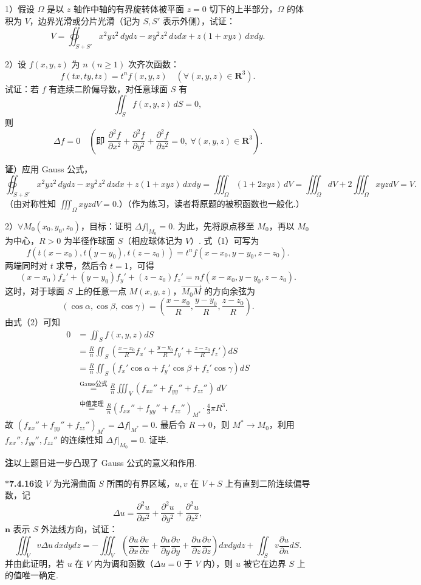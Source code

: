 \documentclass[UTF8, 12pt, fontset=fandol, oneside]{ctexart}
\providecommand{\xlongequal}[1]{\overset{#1}{=}}
\begin{document}
1）假设 $\Omega$ 是以 $z$ 轴作中轴的有界旋转体被平面 $z=0$ 切下的上半部分，$\Omega$ 的体积为 $V$，边界光滑或分片光滑（记为 $S,S'$ 表示外侧），试证：
\[
V=\oiint_{S+S'}x^2yz^2\,dydz-xy^2z^2\,dzdx+z(1+xyz)\,dxdy.
\]

2）设 $f(x,y,z)$ 为 $n\ (n\ge1)$ 次齐次函数：
\[
f(tx,ty,tz)=t^nf(x,y,z)\quad(\forall(x,y,z)\in\mathbf R^3). \tag{1}
\]
试证：若 $f$ 有连续二阶偏导数，对任意球面 $S$ 有
\[
\iint_Sf(x,y,z)\,dS=0, \tag{2}
\]
则
\[
\Delta f=0\quad\left(\text{即 }\frac{\partial^2f}{\partial x^2}+\frac{\partial^2f}{\partial y^2}+\frac{\partial^2f}{\partial z^2}=0,\ \forall(x,y,z)\in\mathbf R^3\right). \tag{3}
\]

\noindent\textbf{证}）应用 Gauss 公式，
\[
\oiint_{S+S'}x^2yz^2\,dydz-xy^2z^2\,dzdx+z(1+xyz)\,dxdy
=\iiint_\Omega(1+2xyz)\,dV=\iiint_\Omega dV+2\iiint_\Omega xyzdV=V.
\]
（由对称性知 $\iiint_\Omega xyzdV=0$.）（作为练习，读者将原题的被积函数也一般化.）

2）$\forall M_0(x_0,y_0,z_0)$，目标：证明 $\Delta f|_{M_0}=0$. 为此，先将原点移至 $M_0$，再以 $M_0$ 为中心，$R>0$ 为半径作球面 $S$（相应球体记为 $V$）. 式（1）可写为
\[
f(t(x-x_0),t(y-y_0),t(z-z_0))=t^nf(x-x_0,y-y_0,z-z_0).
\]
两端同时对 $t$ 求导，然后令 $t=1$，可得
\[
(x-x_0)f_x'+(y-y_0)f_y'+(z-z_0)f_z'=nf(x-x_0,y-y_0,z-z_0).
\]
这时，对于球面 $S$ 上的任意一点 $M(x,y,z)$，$\overrightarrow{M_0M}$ 的方向余弦为
\[
(\cos\alpha,\cos\beta,\cos\gamma)=\left(\frac{x-x_0}{R},\frac{y-y_0}{R},\frac{z-z_0}{R}\right).
\]
由式（2）可知
\[
\begin{aligned}
0&=\iint_Sf(x,y,z)dS\\
&=\frac Rn\iint_S\left(\frac{x-x_0}{R}f_x'+\frac{y-y_0}{R}f_y'+\frac{z-z_0}{R}f_z'\right)dS\\
&=\frac Rn\iint_S(f_x'\cos\alpha+f_y'\cos\beta+f_z'\cos\gamma)dS\\
&\xlongequal{\text{Gauss公式}}\frac Rn\iiint_V(f_{xx}''+f_{yy}''+f_{zz}'')\,dV\\
&\xlongequal{\text{中值定理}}\frac Rn(f_{xx}''+f_{yy}''+f_{zz}'')_{M^*}\cdot\frac43\pi R^3.
\end{aligned}
\]
故 $(f_{xx}''+f_{yy}''+f_{zz}'')_{M^*}=\Delta f|_{M^*}=0$. 最后令 $R\to0$，则 $M^*\to M_0$，利用 $f_{xx}'',f_{yy}'',f_{zz}''$ 的连续性知 $\Delta f|_{M_0}=0$. 证毕.

\noindent\textbf{注}\quad 以上题目进一步凸现了 Gauss 公式的意义和作用.

\noindent\textbf{$*$7.4.16}\quad 设 $V$ 为光滑曲面 $S$ 所围的有界区域，$u,v$ 在 $V+S$ 上有直到二阶连续偏导数，记
\[
\Delta u=\frac{\partial^2u}{\partial x^2}+\frac{\partial^2u}{\partial y^2}+\frac{\partial^2u}{\partial z^2},
\]
$\mathbf n$ 表示 $S$ 外法线方向，试证：
\[
\iiint_V v\Delta u\,dxdydz
=-\iiint_V\left(\frac{\partial u}{\partial x}\frac{\partial v}{\partial x}
+\frac{\partial u}{\partial y}\frac{\partial v}{\partial y}
+\frac{\partial u}{\partial z}\frac{\partial v}{\partial z}\right)dxdydz
+\iint_Sv\frac{\partial u}{\partial n}dS.
\]
并由此证明，若 $u$ 在 $V$ 内为调和函数（$\Delta u=0$ 于 $V$ 内），则 $u$ 被它在边界 $S$ 上的值唯一确定.
\end{document}
